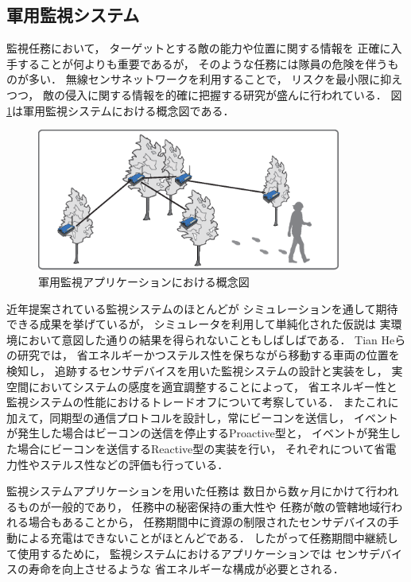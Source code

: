 \subsection{軍用監視システム}
監視任務において，
ターゲットとする敵の能力や位置に関する情報を
正確に入手することが何よりも重要であるが，
そのような任務には隊員の危険を伴うものが多い．
無線センサネットワークを利用することで，
リスクを最小限に抑えつつ，
敵の侵入に関する情報を的確に把握する研究が盛んに行われている．
図\ref{fig:surveillance_system}は軍用監視システムにおける概念図である．

\begin{figure}[htbp]
 \begin{center}
  \includegraphics[width=100mm]{./images/surveillance_system.eps}
 \end{center}
 \caption{軍用監視アプリケーションにおける概念図}
 \label{fig:surveillance_system}
\end{figure}


近年提案されている監視システムのほとんどが
シミュレーションを通して期待できる成果を挙げているが，
シミュレータを利用して単純化された仮説は
実環境において意図した通りの結果を得られないこともしばしばである．
Tian Heらの研究\cite{He04energy-efficientsurveillance}では，
省エネルギーかつステルス性を保ちながら移動する車両の位置を検知し，
追跡するセンサデバイスを用いた監視システムの設計と実装をし，
実空間においてシステムの感度を適宜調整することによって，
省エネルギー性と監視システムの性能におけるトレードオフについて考察している．
またこれに加えて，同期型の通信プロトコルを設計し，常にビーコンを送信し，
イベントが発生した場合はビーコンの送信を停止するProactive型と，
イベントが発生した場合にビーコンを送信するReactive型の実装を行い，
それぞれについて省電力性やステルス性などの評価も行っている．

監視システムアプリケーションを用いた任務は
数日から数ヶ月にかけて行われるものが一般的であり，
任務中の秘密保持の重大性や
任務が敵の管轄地域行われる場合もあることから，
任務期間中に資源の制限されたセンサデバイスの手動による充電はできないことがほとんどである．
したがって任務期間中継続して使用するために，
監視システムにおけるアプリケーションでは
センサデバイスの寿命を向上させるような
省エネルギーな構成が必要とされる．

